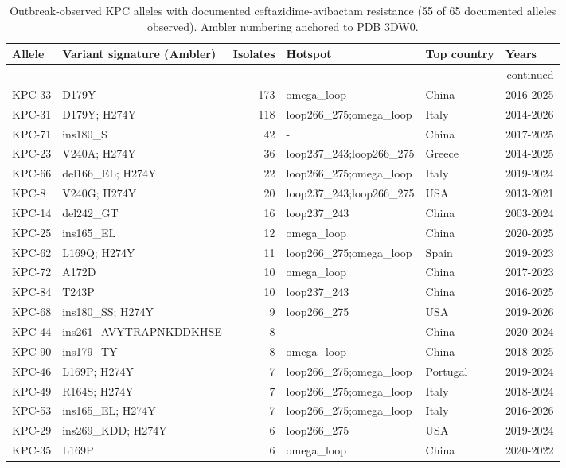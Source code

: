 \footnotesize\begin{longtable}{@{}l p{5.2cm} r p{2.6cm} l l@{}}
\caption{Outbreak-observed KPC alleles with documented ceftazidime-avibactam resistance (55 of 65 documented alleles observed). Ambler numbering anchored to PDB 3DW0.}\\
\hline Allele & Variant signature (Ambler) & Isolates & Hotspot & Top country & Years \\\hline\endhead
\hline\multicolumn{6}{r}{continued}\\\endfoot
\hline\endlastfoot
KPC-33 & D179Y & 173 & omega\_loop & China & 2016-2025 \\
KPC-31 & D179Y; H274Y & 118 & loop266\_275;omega\_loop & Italy & 2014-2026 \\
KPC-71 & ins180\_S & 42 & - & China & 2017-2025 \\
KPC-23 & V240A; H274Y & 36 & loop237\_243;loop266\_275 & Greece & 2014-2025 \\
KPC-66 & del166\_EL; H274Y & 22 & loop266\_275;omega\_loop & Italy & 2019-2024 \\
KPC-8 & V240G; H274Y & 20 & loop237\_243;loop266\_275 & USA & 2013-2021 \\
KPC-14 & del242\_GT & 16 & loop237\_243 & China & 2003-2024 \\
KPC-25 & ins165\_EL & 12 & omega\_loop & China & 2020-2025 \\
KPC-62 & L169Q; H274Y & 11 & loop266\_275;omega\_loop & Spain & 2019-2023 \\
KPC-72 & A172D & 10 & omega\_loop & China & 2017-2023 \\
KPC-84 & T243P & 10 & loop237\_243 & China & 2016-2025 \\
KPC-68 & ins180\_SS; H274Y & 9 & loop266\_275 & USA & 2019-2026 \\
KPC-44 & ins261\_AVYTRAPNKDDKHSE & 8 & - & China & 2020-2024 \\
KPC-90 & ins179\_TY & 8 & omega\_loop & China & 2018-2025 \\
KPC-46 & L169P; H274Y & 7 & loop266\_275;omega\_loop & Portugal & 2019-2024 \\
KPC-49 & R164S; H274Y & 7 & loop266\_275;omega\_loop & Italy & 2018-2024 \\
KPC-53 & ins165\_EL; H274Y & 7 & loop266\_275;omega\_loop & Italy & 2016-2026 \\
KPC-29 & ins269\_KDD; H274Y & 6 & loop266\_275 & USA & 2019-2024 \\
KPC-35 & L169P & 6 & omega\_loop & China & 2020-2022 \\

\end{longtable}

